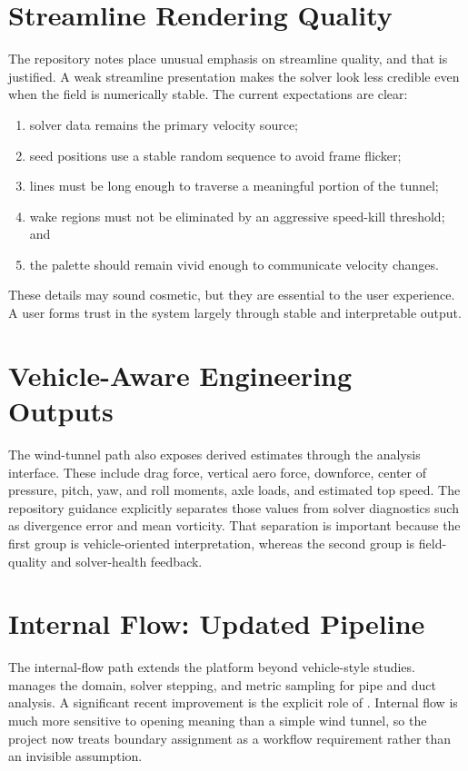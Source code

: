 \documentclass[12pt,a4paper,titlepage]{report}
\begin{document}
\section{Streamline Rendering Quality}
The repository notes place unusual emphasis on streamline quality, and that is justified. A weak streamline presentation makes the solver look less credible even when the field is numerically stable. The current expectations are clear:
\begin{enumerate}
\item solver data remains the primary velocity source;
\item seed positions use a stable random sequence to avoid frame flicker;
\item lines must be long enough to traverse a meaningful portion of the tunnel;
\item wake regions must not be eliminated by an aggressive speed-kill threshold; and
\item the palette should remain vivid enough to communicate velocity changes.
\end{enumerate}

These details may sound cosmetic, but they are essential to the user experience. A user forms trust in the system largely through stable and interpretable output.

\section{Vehicle-Aware Engineering Outputs}
The wind-tunnel path also exposes derived estimates through the analysis interface. These include drag force, vertical aero force, downforce, center of pressure, pitch, yaw, and roll moments, axle loads, and estimated top speed. The repository guidance explicitly separates those values from solver diagnostics such as divergence error and mean vorticity. That separation is important because the first group is vehicle-oriented interpretation, whereas the second group is field-quality and solver-health feedback.

\section{Internal Flow: Updated Pipeline}
The internal-flow path extends the platform beyond vehicle-style studies.  manages the domain, solver stepping, and metric sampling for pipe and duct analysis. A significant recent improvement is the explicit role of . Internal flow is much more sensitive to opening meaning than a simple wind tunnel, so the project now treats boundary assignment as a workflow requirement rather than an invisible assumption.
\end{document}
